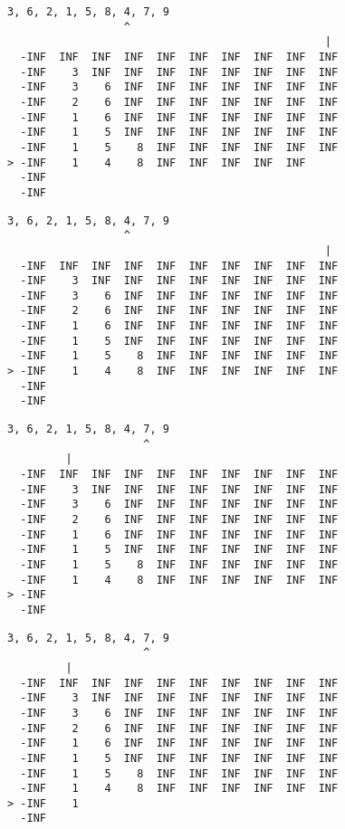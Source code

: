 { \begin{verbatim}
3, 6, 2, 1, 5, 8, 4, 7, 9
                  ^
                                                 |
  -INF  INF  INF  INF  INF  INF  INF  INF  INF  INF
  -INF    3  INF  INF  INF  INF  INF  INF  INF  INF
  -INF    3    6  INF  INF  INF  INF  INF  INF  INF
  -INF    2    6  INF  INF  INF  INF  INF  INF  INF
  -INF    1    6  INF  INF  INF  INF  INF  INF  INF
  -INF    1    5  INF  INF  INF  INF  INF  INF  INF
  -INF    1    5    8  INF  INF  INF  INF  INF  INF
> -INF    1    4    8  INF  INF  INF  INF  INF     
  -INF                                             
  -INF                                             
\end{verbatim} }

{ \begin{verbatim}
3, 6, 2, 1, 5, 8, 4, 7, 9
                  ^
                                                 |
  -INF  INF  INF  INF  INF  INF  INF  INF  INF  INF
  -INF    3  INF  INF  INF  INF  INF  INF  INF  INF
  -INF    3    6  INF  INF  INF  INF  INF  INF  INF
  -INF    2    6  INF  INF  INF  INF  INF  INF  INF
  -INF    1    6  INF  INF  INF  INF  INF  INF  INF
  -INF    1    5  INF  INF  INF  INF  INF  INF  INF
  -INF    1    5    8  INF  INF  INF  INF  INF  INF
> -INF    1    4    8  INF  INF  INF  INF  INF  INF
  -INF                                             
  -INF                                             
\end{verbatim} }

{ \begin{verbatim}
3, 6, 2, 1, 5, 8, 4, 7, 9
                     ^
         |
  -INF  INF  INF  INF  INF  INF  INF  INF  INF  INF
  -INF    3  INF  INF  INF  INF  INF  INF  INF  INF
  -INF    3    6  INF  INF  INF  INF  INF  INF  INF
  -INF    2    6  INF  INF  INF  INF  INF  INF  INF
  -INF    1    6  INF  INF  INF  INF  INF  INF  INF
  -INF    1    5  INF  INF  INF  INF  INF  INF  INF
  -INF    1    5    8  INF  INF  INF  INF  INF  INF
  -INF    1    4    8  INF  INF  INF  INF  INF  INF
> -INF                                             
  -INF                                             
\end{verbatim} }

{ \begin{verbatim}
3, 6, 2, 1, 5, 8, 4, 7, 9
                     ^
         |
  -INF  INF  INF  INF  INF  INF  INF  INF  INF  INF
  -INF    3  INF  INF  INF  INF  INF  INF  INF  INF
  -INF    3    6  INF  INF  INF  INF  INF  INF  INF
  -INF    2    6  INF  INF  INF  INF  INF  INF  INF
  -INF    1    6  INF  INF  INF  INF  INF  INF  INF
  -INF    1    5  INF  INF  INF  INF  INF  INF  INF
  -INF    1    5    8  INF  INF  INF  INF  INF  INF
  -INF    1    4    8  INF  INF  INF  INF  INF  INF
> -INF    1                                        
  -INF                                             
\end{verbatim} }

